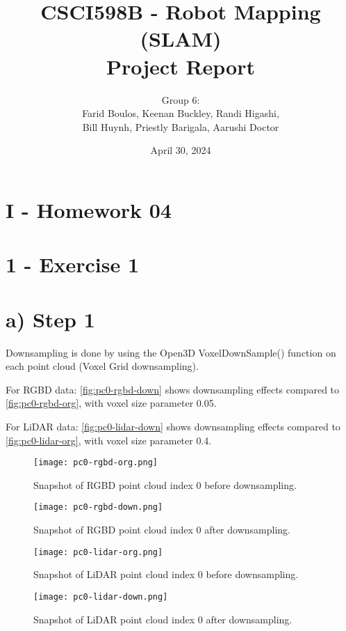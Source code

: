 \documentclass{article}
\title{CSCI598B - Robot Mapping (SLAM)\\
Project Report}
\author{Group 6: \\ 
Farid Boulos, Keenan Buckley, Randi Higashi,\\ 
Bill Huynh, Priestly Barigala, Aarushi Doctor}
\date{April 30, 2024}
\begin{document}
\maketitle

\section*{I - Homework 04}

\section*{1 - Exercise 1}

\section*{a) Step 1}

Downsampling is done by using the Open3D VoxelDownSample() function on each point cloud (Voxel Grid downsampling).

For RGBD data: \autoref{fig:pc0-rgbd-down} shows downsampling effects compared to \autoref{fig:pc0-rgbd-org}, with voxel size parameter 0.05.

For LiDAR data: \autoref{fig:pc0-lidar-down} shows downsampling effects compared to \autoref{fig:pc0-lidar-org}, with voxel size parameter 0.4.

\begin{figure}[H]
    \centering
    \texttt{[image: pc0-rgbd-org.png]}
    \caption{\label{fig:pc0-rgbd-org}Snapshot of RGBD point cloud index 0 before downsampling.}
\end{figure}

\begin{figure}[H]
    \centering
    \texttt{[image: pc0-rgbd-down.png]}
    \caption{\label{fig:pc0-rgbd-down}Snapshot of RGBD point cloud index 0 after downsampling.}
\end{figure}

\begin{figure}[H]
    \centering
    \texttt{[image: pc0-lidar-org.png]}
    \caption{\label{fig:pc0-lidar-org}Snapshot of LiDAR point cloud index 0 before downsampling.}
\end{figure}

\begin{figure}[H]
    \centering
    \texttt{[image: pc0-lidar-down.png]}
    \caption{\label{fig:pc0-lidar-down}Snapshot of LiDAR point cloud index 0 after downsampling.}
\end{figure}
\end{document}
